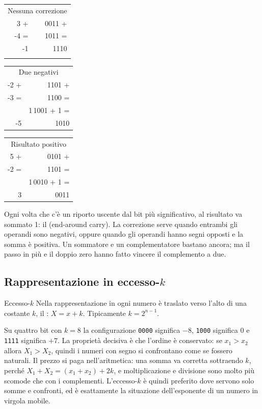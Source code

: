 \begin{center}\ttfamily
\begin{tabular}{@{}r@{\quad}r@{}}
\multicolumn{2}{c}{\textsf{\small Nessuna correzione}}\\
3 + & 0011 +\\ -4 = & 1011 =\\\hline -1 & 1110\\ &
\end{tabular}\qquad\qquad
\begin{tabular}{@{}r@{\quad}r@{}}
\multicolumn{2}{c}{\textsf{\small Due negativi}}\\
-2 + & 1101 +\\ -3 = & 1100 =\\\hline & \textcolor{prgred}{1}\,1001 + 1 =\\ -5 & 1010
\end{tabular}\qquad\qquad
\begin{tabular}{@{}r@{\quad}r@{}}
\multicolumn{2}{c}{\textsf{\small Risultato positivo}}\\
5 + & 0101 +\\ -2 = & 1101 =\\\hline & \textcolor{prgred}{1}\,0010 + 1 =\\ 3 & 0011
\end{tabular}
\end{center}

Ogni volta che c'è un riporto uscente dal bit più significativo, al risultato
va sommato 1: il  (end-around carry). La correzione
serve quando entrambi gli operandi sono negativi, oppure quando gli operandi
hanno segni opposti e la somma è positiva. Un sommatore e un complementatore
bastano ancora; ma il passo in più e il doppio zero hanno fatto vincere il
complemento a due.

\subsection{Rappresentazione in eccesso-$k$}

\begin{definition}{Eccesso-$k$}
Nella rappresentazione in  ogni numero è traslato verso
l'alto di una costante $k$, il : $X = x+k$. Tipicamente
$k=2^{n-1}$.
\end{definition}

Su quattro bit con $k=8$ la configurazione \texttt{0000} significa $-8$,
\texttt{1000} significa 0 e \texttt{1111} significa $+7$. La proprietà decisiva
è che l'ordine è conservato: se $x_1>x_2$ allora $X_1>X_2$, quindi i numeri con
segno si confrontano come se fossero naturali. Il prezzo si paga
nell'aritmetica: una somma va corretta sottraendo $k$, perché
$X_1+X_2 = (x_1+x_2)+2k$, e moltiplicazione e divisione sono molto più scomode
che con i complementi. L'eccesso-$k$ è quindi preferito dove servono solo somme
e confronti, ed è esattamente la situazione dell'esponente di un numero in
virgola mobile.

